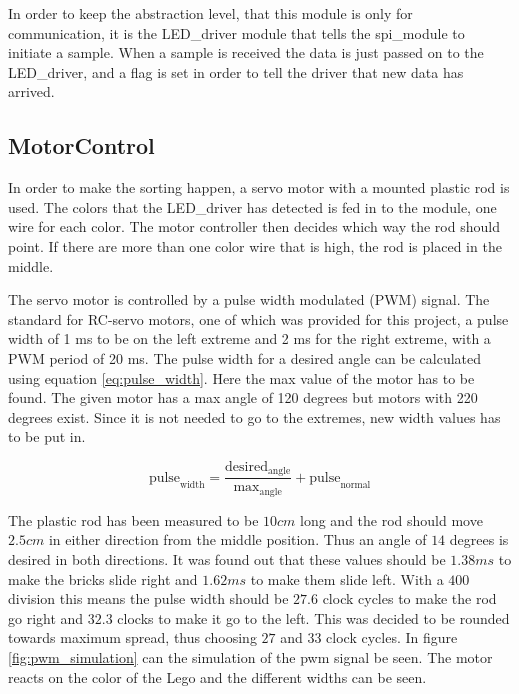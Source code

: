 In order to keep the abstraction level, that this module is only for communication, it is the {LED\_driver} module that tells the {spi\_module} to initiate a sample. 
When a sample is received the data is just passed on to the LED\_driver, and a flag is set in order to tell the driver that new data has arrived.

\subsection{MotorControl}
In order to make the sorting happen, a servo motor with a mounted plastic rod is used. The colors that the {LED\_driver} has detected is fed in to the module, one wire for each color. The motor controller then decides which way the rod should point. If there are more than one color wire that is high, the rod is placed in the middle. 

The servo motor is controlled by a pulse width modulated (PWM) signal. The standard for RC-servo motors\cite[p. 917]{book:prac_ele}, one of which was provided for this project, a pulse width of 1 ms to be on the left extreme and 2 ms for the right extreme, with a PWM period of 20 ms. 
The pulse width for a desired angle can be calculated using equation \ref{eq:pulse_width}.
Here the max value of the motor has to be found.
The given motor has a max angle of 120 degrees but motors with 220 degrees exist.
Since it is not needed to go to the extremes, new width values has to be put in. 

\begin{equation}
 \text{pulse}_\text{width} = \frac{\text{desired}_{\text{angle}}}{\text{max}_{\text{angle}}}+\text{pulse}_{\text{normal}} \label{eq:pulse_width}
\end{equation}

The plastic rod has been measured to be $10 cm$ long and the rod should move $2.5 cm$ in either direction from the middle position.
Thus an angle of $14$ degrees is desired in both directions.
It was found out that these values should be $1.38 ms$ to make the bricks slide right and $1.62 ms$ to make them slide left.
With a $400$ division this means the pulse width should be $27.6$ clock cycles to make the rod go right and $32.3$ clocks to make it go to the left.
This was decided to be rounded towards maximum spread, thus choosing $27$ and $33$ clock cycles.
In figure \ref{fig:pwm_simulation} can the simulation of the pwm signal be seen.
The motor reacts on the color of the Lego and the different widths can be seen.

